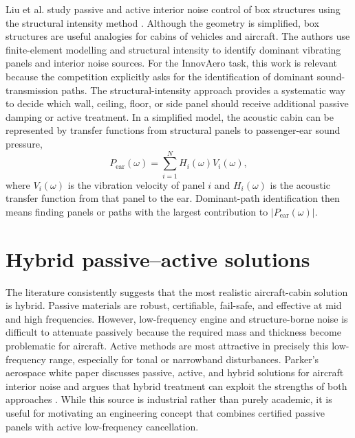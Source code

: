 Liu et al. study passive and active interior noise control of box structures using the structural intensity method \cite{liu2006passive}. Although the geometry is simplified, box structures are useful analogies for cabins of vehicles and aircraft. The authors use finite-element modelling and structural intensity to identify dominant vibrating panels and interior noise sources. For the InnovAero task, this work is relevant because the competition explicitly asks for the identification of dominant sound-transmission paths. The structural-intensity approach provides a systematic way to decide which wall, ceiling, floor, or side panel should receive additional passive damping or active treatment. In a simplified model, the acoustic cabin can be represented by transfer functions from structural panels to passenger-ear sound pressure,
\begin{equation}
    P_{\mathrm{ear}}(\omega)=\sum_{i=1}^{N} H_i(\omega)V_i(\omega),
    \label{eq:panel-transfer}
\end{equation}
where $V_i(\omega)$ is the vibration velocity of panel $i$ and $H_i(\omega)$ is the acoustic transfer function from that panel to the ear. Dominant-path identification then means finding panels or paths with the largest contribution to $|P_{\mathrm{ear}}(\omega)|$.

\section{Hybrid passive--active solutions}
\label{sec:hybrid-solutions}

The literature consistently suggests that the most realistic aircraft-cabin solution is hybrid. Passive materials are robust, certifiable, fail-safe, and effective at mid and high frequencies. However, low-frequency engine and structure-borne noise is difficult to attenuate passively because the required mass and thickness become problematic for aircraft. Active methods are most attractive in precisely this low-frequency range, especially for tonal or narrowband disturbances. Parker's aerospace white paper discusses passive, active, and hybrid solutions for aircraft interior noise and argues that hybrid treatment can exploit the strengths of both approaches \cite{parkerWhitepaper}. While this source is industrial rather than purely academic, it is useful for motivating an engineering concept that combines certified passive panels with active low-frequency cancellation.

